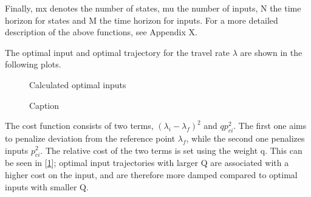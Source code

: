 Finally, mx denotes the number of states, mu the number of inputs, N the time horizon for states and M the time horizon for inputs. For a more detailed description of the above functions, see Appendix X.

The optimal input and optimal trajectory for the travel rate $\lambda$ are shown in the following plots.
\clearpage

\begin{figure}[h]
    \centering
    \caption{Calculated optimal inputs}
    \label{fig:optimal_inputs}
\end{figure}

\begin{figure}[H]
    \centering
    \caption{Caption}
    \label{fig:optimal_lambda}
\end{figure}

The cost function  consists of two terms, $(\lambda_i - \lambda_f)^2$ and $qp_{ci}^2$. The first one aims to penalize deviation from the reference point $\lambda_f$, while the second one penalizes inputs $p_{ci}^2$. The relative cost of the two terms is set using the weight q. This can be seen in [\ref{fig:optimal_inputs}]; optimal input trajectories with larger Q are associated with a higher cost on the input, and are therefore more damped compared to optimal inputs with smaller Q. 

